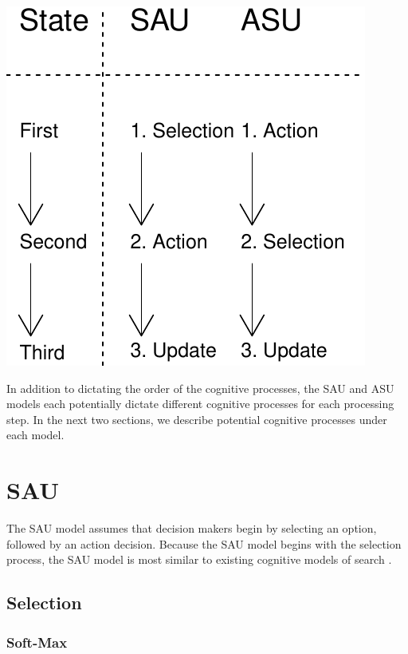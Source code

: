 \documentclass[a4paper,doc,natbib,floatsintext]{apa6}\usepackage[]{graphicx}\usepackage[]{color}
\makeatletter
\def\maxwidth{ %
  \ifdim\Gin@nat@width>\linewidth
    \linewidth
  \else
    \Gin@nat@width
  \fi
}
\newenvironment{knitrout}{}{} %
\makeatother
\begin{document}
\begin{center}
\begin{knitrout}
\color{fgcolor}
\includegraphics[width=\maxwidth]{figure/unnamed-chunk-1-1} 

\end{knitrout}
\end{center}

In addition to dictating the order of the cognitive processes, the SAU and ASU models each potentially dictate different cognitive processes for each processing step. In the next two sections, we describe potential cognitive processes under each model.

\section{SAU}

The SAU model assumes that decision makers begin by selecting an option, followed by an action decision. Because the SAU model begins with the selection process, the SAU model is most similar to existing cognitive models of search \citep{yechiam2005models}.

\subsection{Selection}

\subsubsection{Soft-Max}
\end{document}
